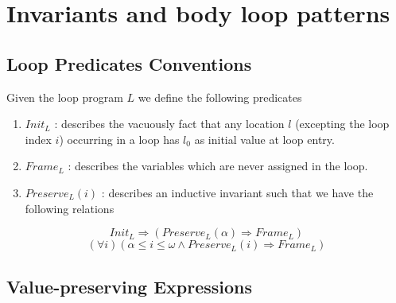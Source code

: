 \documentclass[a4paper,10pt]{article}
\newcommand{\idx}{\ensuremath{i}\xspace}
\newcommand{\idxinitial}{\ensuremath{\alpha}\xspace}
\newcommand{\idxfinal}{\ensuremath{\omega}\xspace}
\newcommand{\initcond}[1]{\ensuremath{\mathit{Init_{#1}}}}
\newcommand{\framecond}[1]{\ensuremath{\mathit{Frame_{#1}}}}
\newcommand{\preservecond}[2]{\ensuremath{\mathit{Preserve_{#1}(#2)}}}
\begin{document}
\section{Invariants and body loop patterns}

\subsection{Loop Predicates Conventions}
Given the loop program $L$ we define the following predicates 
\begin{enumerate}
\item \initcond{L} : describes the vacuously fact that any location $l$ 
(excepting the loop index \idx) occurring in  a loop has $l_0$ as initial value at loop entry.
\item \framecond{L} : describes the variables which are never assigned in the loop.
\item \preservecond{L}{\idx} : describes an inductive invariant such that we have the following relations
\end{enumerate}

$$\initcond{L} \Rightarrow (\preservecond{L}{\idxinitial} \Rightarrow \framecond{L})$$
$$(\forall \idx) (\idxinitial \leq \idx \leq \idxfinal \land \preservecond{L}{\idx} \Rightarrow \framecond{L})$$
\subsection{Value-preserving Expressions}
\end{document}
